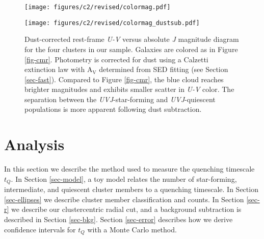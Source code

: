 \begin{figure*}
\centering \texttt{[image: figures/c2/revised/colormag.pdf]}
\caption[Color-magnitude diagram for the high-redshift SpARCS cluster sample]{Rest-frame \textit{U}-\textit{V} versus absolute \textit{J} magnitude diagram for all photometric-redshift-selected cluster members of the four clusters in the sample (see Table \ref{tbl-clusters}).
The inset panels show rest-frame \textit{U-V} versus \textit{V-J} color-color diagrams, and galaxies are colored red (quiescent) or blue (star-forming) according to their \textit{U-V} and \textit{V-J} colors (see Section \ref{sec-UVJ}).
The mass completeness of our sample corresponds roughly to a magnitude limit of $M_J \lesssim -23$.
\label{fig-cmr}}
\texttt{[image: figures/c2/revised/colormag\_dustsub.pdf]}
\caption[Dust-corrected color-magnitude diagram for the high-redshift SpARCS cluster sample]{Dust-corrected rest-frame \textit{U-V} versus absolute \textit{J} magnitude diagram for the four clusters in our sample.
Galaxies are colored as in Figure \ref{fig-cmr}.
Photometry is corrected for dust using a Calzetti \citep{Calzetti:2001hh} extinction law with A$_\mathrm{V}$ determined from SED fitting (see Section \ref{sec-fast}).
Compared to Figure \ref{fig-cmr}, the blue cloud reaches brighter magnitudes and exhibits smaller scatter in \textit{U-V} color.
The separation between the \textit{UVJ}-star-forming and \textit{UVJ}-quiescent populations is more apparent following dust subtraction.
\label{fig-cmr-dustsub}}
\end{figure*}

\section{Analysis}\label{sec-analysis}

In this section we describe the method used to measure the quenching timescale $t_Q$.
In Section \ref{sec-model}, a toy model relates the number of star-forming, intermediate, and quiescent cluster members to a quenching timescale.
In Section \ref{sec-ellipses} we describe cluster member classification and counts.
In Section \ref{sec-r} we describe our clustercentric radial cut, and a background subtraction is described in Section \ref{sec-bkg}.
Section \ref{sec-error} describes how we derive confidence intervals for $t_Q$ with a Monte Carlo method.

